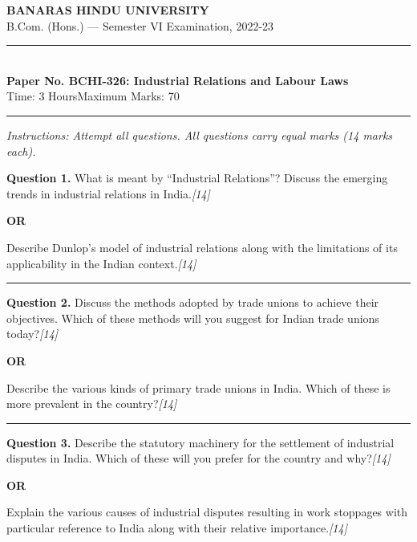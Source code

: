 \documentclass[11pt,a4paper]{article}
\newcommand{\pts}[1]{\hfill   \textit{[#1]}}
\begin{document}
\begin{center}
  {\large\bfseries BANARAS HINDU UNIVERSITY}\\[2pt]
  {\normalsize B.Com. (Hons.) --- Semester VI Examination, 2022-23}\\[6pt]
  \rule{0.8\linewidth}{0.5pt}\\[6pt]
  {\large\bfseries Paper No. BCHI-326: Industrial Relations and Labour Laws}\\[4pt]
  {\normalsize Time: 3 Hours\hfill Maximum Marks: 70}
\end{center}

\rule{\linewidth}{0.4pt}

\smallskip



\noindent   \textit{Instructions: Attempt all questions. All questions carry equal marks (14 marks each).}

\bigskip




\noindent   \textbf{Question 1.}
What is meant by ``Industrial Relations''? Discuss the emerging trends in industrial relations in India.\pts{14}

\centerline{   \textbf{OR}}

Describe Dunlop's model of industrial relations along with the limitations of its applicability in the Indian context.\pts{14}

\medskip\rule{\linewidth}{0.2pt}




\noindent   \textbf{Question 2.}
Discuss the methods adopted by trade unions to achieve their objectives. Which of these methods will you suggest for Indian trade unions today?\pts{14}

\centerline{   \textbf{OR}}

Describe the various kinds of primary trade unions in India. Which of these is more prevalent in the country?\pts{14}

\medskip\rule{\linewidth}{0.2pt}




\noindent   \textbf{Question 3.}
Describe the statutory machinery for the settlement of industrial disputes in India. Which of these will you prefer for the country and why?\pts{14}

\centerline{   \textbf{OR}}

Explain the various causes of industrial disputes resulting in work stoppages with particular reference to India along with their relative importance.\pts{14}
\end{document}
